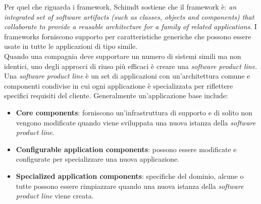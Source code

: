 		 	Per quel che riguarda i framework, Schimdt sostiene che il framework è: \textit{an integrated set of software artifacts (such as classes, objects and components) that collaborate to provide a reusable architecture for a family of related applications}. I frameworks forniscono supporto per caratteristiche generiche che possono essere usate in tutte le applicazioni di tipo simile. \\
		 	Quando una compagnia deve supportare un numero di sistemi simili ma non identici, uno degli approcci di riuso più efficaci è creare una \textit{software product line}. Una \textit{software product line} è un set di applicazioni con un'architettura comune e componenti condivise in cui ogni applicazione è specializzata per riflettere specifici requisiti del cliente.  Generalmente un'applicazione base include:
		 	\begin{itemize}
		 		\item \textbf{Core components}: forniscono un'infrastruttura di supporto e di solito non vengono modificate quando viene sviluppata una nuova istanza della \textit{software product line}.
		 		\item \textbf{Configurable application components}: possono essere modificate e configurate per specializzare una nuova applicazione.
		 		\item \textbf{Specialized application components}: specifiche del dominio, alcune o tutte possono essere rimpiazzare quando una nuova istanza della \textit{software product line} viene creata.
		 	\end{itemize}

